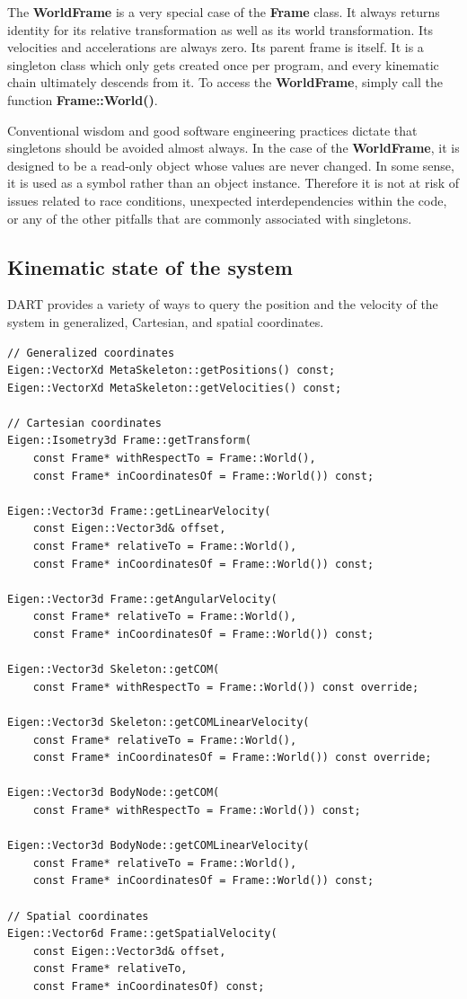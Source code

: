 The \textbf{WorldFrame} is a very special case of the \textbf{Frame} class. It always returns identity for its relative transformation as well as its world transformation. Its velocities and accelerations are always zero. Its parent frame is itself. It is a singleton class which only gets created once per program, and every kinematic chain ultimately descends from it. To access the \textbf{WorldFrame}, simply call the function \textbf{Frame::World()}.

Conventional wisdom and good software engineering practices dictate that singletons should be avoided almost always. In the case of the \textbf{WorldFrame}, it is designed to be a read-only object whose values are never changed. In some sense, it is used as a symbol rather than an object instance. Therefore it is not at risk of issues related to race conditions, unexpected interdependencies within the code, or any of the other pitfalls that are commonly associated with singletons.

\subsection{Kinematic state of the system}
DART provides a variety of ways to query the position and the velocity of the system in generalized, Cartesian, and spatial coordinates. 

\begin{lstlisting}
// Generalized coordinates
Eigen::VectorXd MetaSkeleton::getPositions() const;
Eigen::VectorXd MetaSkeleton::getVelocities() const;

// Cartesian coordinates
Eigen::Isometry3d Frame::getTransform(
    const Frame* withRespectTo = Frame::World(), 
    const Frame* inCoordinatesOf = Frame::World()) const;
    
Eigen::Vector3d Frame::getLinearVelocity(
    const Eigen::Vector3d& offset, 
    const Frame* relativeTo = Frame::World(), 
    const Frame* inCoordinatesOf = Frame::World()) const;
    
Eigen::Vector3d Frame::getAngularVelocity(
    const Frame* relativeTo = Frame::World(), 
    const Frame* inCoordinatesOf = Frame::World()) const;
    
Eigen::Vector3d Skeleton::getCOM(
    const Frame* withRespectTo = Frame::World()) const override;
    
Eigen::Vector3d Skeleton::getCOMLinearVelocity(
    const Frame* relativeTo = Frame::World(), 
    const Frame* inCoordinatesOf = Frame::World()) const override;
    
Eigen::Vector3d BodyNode::getCOM(
    const Frame* withRespectTo = Frame::World()) const;
    
Eigen::Vector3d BodyNode::getCOMLinearVelocity(
    const Frame* relativeTo = Frame::World(), 
    const Frame* inCoordinatesOf = Frame::World()) const;

// Spatial coordinates
Eigen::Vector6d Frame::getSpatialVelocity(
    const Eigen::Vector3d& offset, 
    const Frame* relativeTo, 
    const Frame* inCoordinatesOf) const;
\end{lstlisting}

